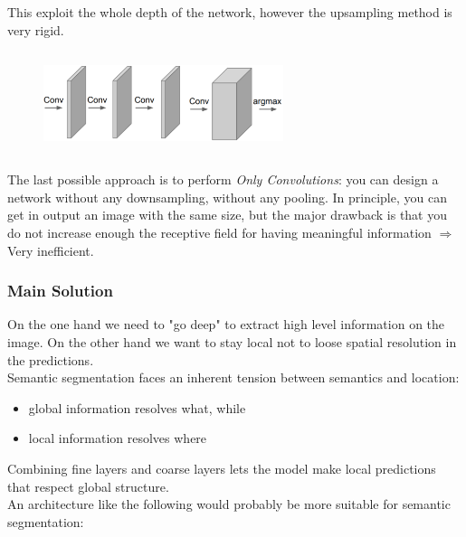 This exploit the whole depth of the network, however the upsampling method is very rigid. \\



\begin{figure}
    \includegraphics[width=7cm, height=3cm]{images/only_convolutions.png}
\end{figure}  

The last possible approach is to perform \textit{Only Convolutions}: you can design a network without any downsampling, without any pooling. In principle, you can get in output an image with the same size, but the major drawback is that you do not increase enough the receptive field for having meaningful information $\Rightarrow$ Very inefficient. \\

\subsubsection{Main Solution}
On the one hand we need to "go deep" to extract high level information on the image. On the other hand we want to stay local not to loose spatial resolution in the predictions.\\
Semantic segmentation faces an inherent tension between semantics and location: 
\begin{itemize}
    \item global information resolves what, while
    \item local information resolves where
\end{itemize}{}
Combining fine layers and coarse layers lets the model make local predictions that respect global structure. \\
An architecture like the following would probably be more suitable for semantic segmentation: \\

